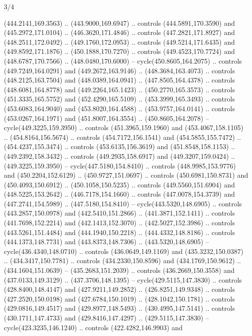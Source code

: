 \begin{flagdescription}{3/4}
\begin{scope}[xshift=0.5\flaglength]
\begin{scope}[scale=0.002\flagwidth,yshift=146.5mm,xshift=-52mm]
\begin{scope}[y=0.80pt, x=0.80pt, yscale=-1, xscale=1, inner sep=0pt, outer sep=0pt]
\begin{scope}[cm={{1.03426,0.0,0.0,1.03426,(-229.44745,-87.97837)}}]
\begin{scope}[draw=black,line width=0.872\lw]
\begin{scope}[fill=black,line join=round,line cap=round]
  (444.2141,169.3563) .. (443.9000,169.6947) .. controls (444.5891,170.3590) and
  (445.2972,171.0104) .. (446.3620,171.4846) .. controls (447.2821,171.8927) and
  (448.2511,172.0492) .. (449.1760,172.0953) .. controls (449.5214,171.6435) and
  (449.8592,171.1876) .. (450.1888,170.7270) .. controls (449.4523,170.7724) and
  (448.6787,170.7566) .. (448.0480,170.6000) -- cycle(450.8605,164.2075) ..
  controls (449.7249,164.0291) and (449.2672,163.9146) .. (448.3684,163.4073) ..
  controls (448.2125,163.7504) and (448.0389,164.0941) .. (447.8505,164.4378) ..
  controls (448.6081,164.8778) and (449.2264,165.1423) .. (450.2770,165.3573) ..
  controls (451.3335,165.5752) and (452.4290,165.5109) .. (453.3999,165.3493) ..
  controls (453.6083,164.9040) and (453.8020,164.4588) .. (453.9757,164.0141) ..
  controls (453.0267,164.1971) and (451.8007,164.3554) .. (450.8605,164.2078) --
  cycle(449.3225,159.3950) .. controls (451.3965,159.1960) and
  (453.4067,158.1105) .. (454.8164,156.5674) .. controls (454.7172,156.1541) and
  (454.5855,155.7472) .. (454.4237,155.3474) .. controls (453.6135,156.3619) and
  (451.8548,158.1153) .. (449.2392,158.3432) .. controls (449.2935,158.6917) and
  (449.3207,159.0424) .. (449.3225,159.3950) -- cycle(447.5180,154.8410) ..
  controls (448.9985,153.9776) and (450.2204,152.6129) .. (450.9727,151.0697) ..
  controls (450.6981,150.8731) and (450.4093,150.6912) .. (450.1058,150.5235) ..
  controls (449.5560,151.6904) and (448.5225,153.2642) .. (446.7178,154.1660) ..
  controls (447.0078,154.3739) and (447.2741,154.5989) .. (447.5180,154.8410) --
  cycle(443.5320,148.6905) .. controls (443.2857,150.0978) and
  (442.5410,151.2866) .. (441.3871,152.1411) .. controls (441.7698,152.2214) and
  (442.1413,152.3070) .. (442.5027,152.3986) .. controls (443.5261,151.4484) and
  (444.1940,150.2218) .. (444.4332,148.8186) .. controls (444.1373,148.7731) and
  (443.8373,148.7306) .. (443.5320,148.6905) -- cycle(436.4340,148.0710) ..
  controls (436.0649,149.1169) and (435.3232,150.0387) .. (434.3417,150.7781) ..
  controls (434.2330,150.8596) and (434.1769,150.9612) .. (434.1604,151.0639) --
  (435.2683,151.2039) .. controls (436.2669,150.3558) and (437.0133,149.3129) ..
  (437.3706,148.1395) -- cycle(429.5115,147.3830) .. controls
  (428.8400,148.4147) and (427.9211,149.2852) .. (426.8251,149.9348) .. controls
  (427.2520,150.0198) and (427.6784,150.1019) .. (428.1042,150.1781) .. controls
  (429.0816,149.4517) and (429.8977,148.5493) .. (430.4995,147.5141) .. controls
  (430.1711,147.4733) and (429.8416,147.4297) .. (429.5115,147.3830) --
  cycle(423.3235,146.1240) .. controls (422.4282,146.9903) and

\end{scope}
\end{scope}
\end{scope}
\end{scope}
\end{scope}
\end{scope}
\end{flagdescription}
